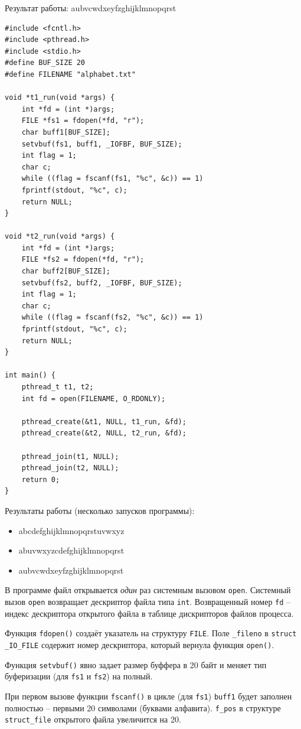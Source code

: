 Результат работы: aubvcwdxeyfzghijklmnopqrst

\begin{lstlisting}[caption={\text{Программа №1 (многопоточная)}}]
#include <fcntl.h>
#include <pthread.h>
#include <stdio.h>
#define BUF_SIZE 20
#define FILENAME "alphabet.txt"

void *t1_run(void *args) {
	int *fd = (int *)args;
	FILE *fs1 = fdopen(*fd, "r");
	char buff1[BUF_SIZE];
	setvbuf(fs1, buff1, _IOFBF, BUF_SIZE);
	int flag = 1;
	char c;
	while ((flag = fscanf(fs1, "%c", &c)) == 1)
	fprintf(stdout, "%c", c);
	return NULL;
}

void *t2_run(void *args) {
	int *fd = (int *)args;
	FILE *fs2 = fdopen(*fd, "r");
	char buff2[BUF_SIZE];
	setvbuf(fs2, buff2, _IOFBF, BUF_SIZE);
	int flag = 1;
	char c;
	while ((flag = fscanf(fs2, "%c", &c)) == 1)
	fprintf(stdout, "%c", c);
	return NULL;
}

int main() {
	pthread_t t1, t2;
	int fd = open(FILENAME, O_RDONLY);
	
	pthread_create(&t1, NULL, t1_run, &fd);
	pthread_create(&t2, NULL, t2_run, &fd);
	
	pthread_join(t1, NULL);
	pthread_join(t2, NULL);
	return 0;
}
\end{lstlisting}

Результаты работы (несколько запусков программы): 
\begin{itemize}
\item abcdefghijklmnopqrstuvwxyz
\item abuvwxyzcdefghijklmnopqrst
\item aubvcwdxeyfzghijklmnopqrst
\end{itemize}


В программе файл открывается \textit{один} раз системным вызовом \texttt{open}. Системный вызов \texttt{open} возвращает дескриптор файла типа \texttt{int}. Возвращенный номер \texttt{fd} -- индекс дескриптора открытого файла в таблице дискрипторов файлов процесса.
	
 Функция \texttt{fdopen()} создаёт указатель на структуру \texttt{FILE}. Поле \texttt{\_fileno} в \texttt{struct \_IO\_FILE} содержит номер дескриптора, который вернула функция \texttt{open()}.
	
 Функция \texttt{setvbuf()} явно задает размер буффера в 20 байт и меняет тип буферизации	(для \texttt{fs1} и \texttt{fs2}) на полный.
	
 При первом вызове функции \texttt{fscanf()} в цикле (для \texttt{fs1}) \texttt{buff1} будет заполнен полностью -- первыми 20 символами (буквами алфавита). \texttt{f\_pos} в структуре \texttt{struct\_file} открытого файла увеличится на 20.
	
